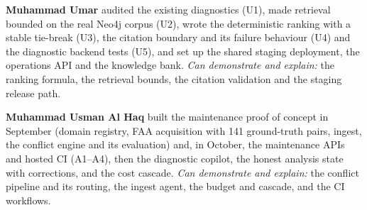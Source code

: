 \textbf{Muhammad Umar} audited the existing diagnostics (U1), made retrieval bounded on the real Neo4j corpus (U2), wrote the deterministic ranking with a stable tie-break (U3), the citation boundary and its failure behaviour (U4) and the diagnostic backend tests (U5), and set up the shared staging deployment, the operations API and the knowledge bank. \emph{Can demonstrate and explain:} the ranking formula, the retrieval bounds, the citation validation and the staging release path.

\textbf{Muhammad Usman Al Haq} built the maintenance proof of concept in September (domain registry, FAA acquisition with 141 ground-truth pairs, ingest, the conflict engine and its evaluation) and, in October, the maintenance APIs and hosted CI (A1--A4), then the diagnostic copilot, the honest analysis state with corrections, and the cost cascade. \emph{Can demonstrate and explain:} the conflict pipeline and its routing, the ingest agent, the budget and cascade, and the CI workflows.

